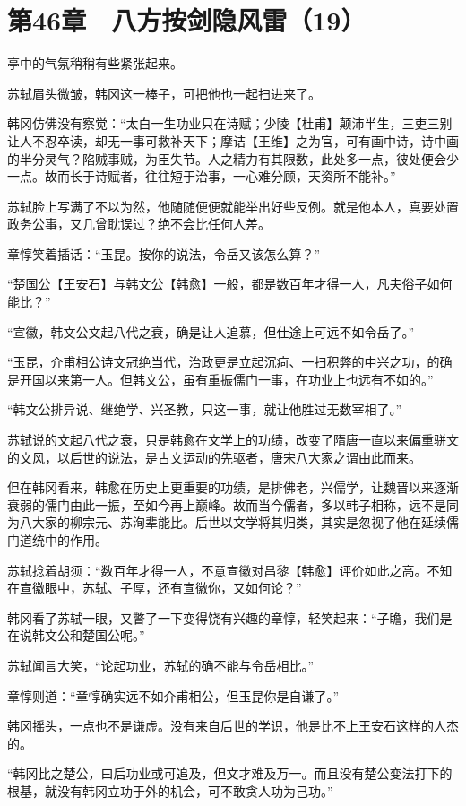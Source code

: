 \section{第46章　八方按剑隐风雷（19）}

亭中的气氛稍稍有些紧张起来。

苏轼眉头微皱，韩冈这一棒子，可把他也一起扫进来了。

韩冈仿佛没有察觉：“太白一生功业只在诗赋；少陵【杜甫】颠沛半生，三吏三别让人不忍卒读，却无一事可救补天下；摩诘【王维】之为官，可有画中诗，诗中画的半分灵气？陷贼事贼，为臣失节。人之精力有其限数，此处多一点，彼处便会少一点。故而长于诗赋者，往往短于治事，一心难分顾，天资所不能补。”

苏轼脸上写满了不以为然，他随随便便就能举出好些反例。就是他本人，真要处置政务公事，又几曾耽误过？绝不会比任何人差。

章惇笑着插话：“玉昆。按你的说法，令岳又该怎么算？”

“楚国公【王安石】与韩文公【韩愈】一般，都是数百年才得一人，凡夫俗子如何能比？”

“宣徽，韩文公文起八代之衰，确是让人追慕，但仕途上可远不如令岳了。”

“玉昆，介甫相公诗文冠绝当代，治政更是立起沉疴、一扫积弊的中兴之功，的确是开国以来第一人。但韩文公，虽有重振儒门一事，在功业上也远有不如的。”

“韩文公排异说、继绝学、兴圣教，只这一事，就让他胜过无数宰相了。”

苏轼说的文起八代之衰，只是韩愈在文学上的功绩，改变了隋唐一直以来偏重骈文的文风，以后世的说法，是古文运动的先驱者，唐宋八大家之谓由此而来。

但在韩冈看来，韩愈在历史上更重要的功绩，是排佛老，兴儒学，让魏晋以来逐渐衰弱的儒门由此一振，至如今再上巅峰。故而当今儒者，多以韩子相称，远不是同为八大家的柳宗元、苏洵辈能比。后世以文学将其归类，其实是忽视了他在延续儒门道统中的作用。

苏轼捻着胡须：“数百年才得一人，不意宣徽对昌黎【韩愈】评价如此之高。不知在宣徽眼中，苏轼、子厚，还有宣徽你，又如何论？”

韩冈看了苏轼一眼，又瞥了一下变得饶有兴趣的章惇，轻笑起来：“子瞻，我们是在说韩文公和楚国公呢。”

苏轼闻言大笑，“论起功业，苏轼的确不能与令岳相比。”

章惇则道：“章惇确实远不如介甫相公，但玉昆你是自谦了。”

韩冈摇头，一点也不是谦虚。没有来自后世的学识，他是比不上王安石这样的人杰的。

“韩冈比之楚公，曰后功业或可追及，但文才难及万一。而且没有楚公变法打下的根基，就没有韩冈立功于外的机会，可不敢贪人功为己功。”

